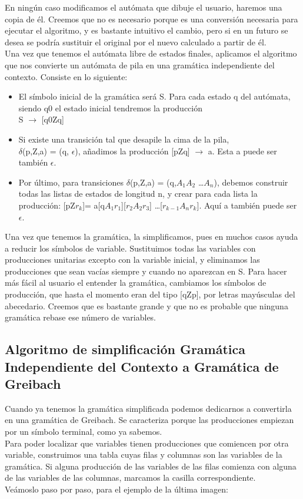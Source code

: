 \documentclass[12pt,a4paper,spanish]{book}
\begin{document}
En ning\'un caso modificamos el aut\'omata que dibuje el usuario, haremos una copia de \'el. Creemos que no es necesario porque es una conversi\'on necesaria para ejecutar el algoritmo, y es bastante intuitivo el cambio, pero si en un futuro se desea se podr\'ia sustituir el original por el nuevo calculado a partir de \'el.\\
\newpage
Una vez que tenemos el aut\'omata libre de estados finales, aplicamos el algoritmo que nos convierte un aut\'omata de pila en una gram\'atica independiente del contexto. Consiste en lo siguiente:
\begin{itemize}
\item El s\'imbolo inicial de la gram\'atica ser\'a S. Para cada estado q del aut\'omata, siendo q0 el estado inicial tendremos la producci\'on\\ S $\rightarrow$ [q0Zq]
\item Si existe una transici\'on tal que desapile la cima de la pila,\\ $\delta$(p,Z,a) = (q, $\epsilon$),
a\~nadimos la producci\'on [pZq] $\rightarrow$ a. Esta a puede ser tambi\'en $\epsilon$.
\item Por \'ultimo, para transiciones $\delta$(p,Z,a) = (q,$A_{1}A_{2}$ \ldots $A_{n}$), debemos construir todas las listas de estados de longitud n, y crear para cada lista la producci\'on:
[pZ$r_{k}$]= a[q$A_{1}r_{1}$][$r_{2}A_{2}r_{3}$] \ldots [$r_{k-1}A_{n}r_{k}$]. Aqu\'i a tambi\'en puede ser $\epsilon$.
\end{itemize}
Una vez que tenemos la gram\'atica, la simplificamos, pues en muchos casos ayuda a reducir los s\'imbolos de variable. Sustituimos todas las variables con producciones unitarias excepto con la variable inicial, y eliminamos las producciones que sean vac\'ias siempre y cuando no aparezcan en S. Para hacer m\'as f\'acil al usuario el entender la gram\'atica, cambiamos los s\'imbolos de producci\'on, que hasta el momento eran del tipo [qZp], por letras may\'usculas del abecedario. Creemos que es bastante grande y que no es probable que ninguna gram\'atica rebase ese n\'umero de variables.
\newpage
\subsection{Algoritmo de simplificaci\'on Gram\'atica Independiente del Contexto a Gram\'atica de Greibach}
Cuando ya tenemos la gram\'atica simplificada podemos dedicarnos a convertirla en una gram\'atica de Greibach. Se caracteriza porque las producciones empiezan por un s\'imbolo terminal, como ya sabemos.\\ 
Para poder localizar que variables tienen producciones que comiencen por otra variable, construimos una tabla cuyas filas y columnas son las variables de la gram\'atica. Si alguna producci\'on de las variables de las filas comienza con alguna de las variables de las columnas, marcamos la casilla correspondiente.\\ 
Ve\'amoslo paso por paso, para el ejemplo de la \'ultima imagen:\\
\end{document}

